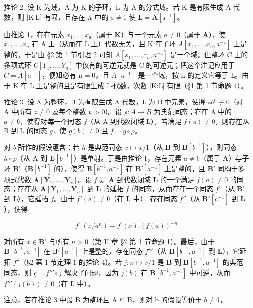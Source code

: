 推论 2. 设 K 为域，A 为 K 的子环，L 为 A 的分式域。若 K 是有限生成 A-代数，则 {[}K:L{]} 有限，且存在 A 中的 \(a \neq 0\) 使 \(\mathbf{L} = \mathbf{A}[a^{-1}]\)。

由推论 1，存在元素 \(x_{1}, \ldots, x_{n}\)（属于 \(\mathbf{K}\)）与一个元素 \(a \neq 0\)（属于 \(\mathbf{A}\)），使 \(x_{1}, \ldots, x_{n}\) 在 A 上（从而在 L 上）代数无关，且 K 在子环 \(A[x_{1},\ldots,x_{n},a^{-1}]\) 上是整的。于是由 §2 第 1 节引理 2 可知 \(A[x_{1},\ldots,x_{n},a^{-1}]\) 是一个域。但整环 C 上的多项式环 \(C[Y_{1},\ldots,Y_{n}]\) 中仅有的可逆元就是 C 的可逆元；把这个注记应用于 \(C = A[a^{-1}]\)，便知必有 n = 0，且 \(A[a^{-1}]\) 是一个域，按 L 的定义它等于 L。由于 K 在 L 上是整的且是有限生成 L-代数，次数 {[}K:L{]} 有限（§1 第 1 节命题 4）。

推论 3. 设 A 为整环，B 为有限生成 A-代数，b 为 B 中元素，使得 \(zb^n \neq 0\)（对 A 中所有 \(z \neq 0\) 及每个整数 \(n > 0\)）。设 \(\rho: A \to B\) 为典范同态；存在 A 中的 \(a \neq 0\)，使得对每一个同态 \(f\)（从 A 到代数闭域 L），若满足 \(f(a) \neq 0\)，则存在从 B 到 L 的同态 \(g\)，使 \(g(b) \neq 0\) 且 \(f = g \circ \rho\)。

对 \(b\) 所作的假设蕴含：若 \(h\) 是典范同态 \(x \mapsto x / 1\)（从 \(\mathbf{B}\) 到 \(\mathbf{B}[b^{-1}]\)），则同态 \(h \circ \rho\)（从 \(\mathbf{A}\) 到 \(\mathbf{B}[b^{-1}]\)）是单射。于是由推论 1，存在元素 \(a \neq 0\)（属于 \(\mathbf{A}\)）与子环 \(\mathbf{B}'\)（\(\mathbf{B}[b^{-1}]\) 的），使得 \(\mathbf{B}[b^{-1}, a^{-1}]\) 在 \(\mathbf{B}'[a^{-1}]\) 上是整的，且 \(\mathbf{B}'\) 同构于多项式代数 \(\mathbf{A}[\mathbf{Y}_1, \ldots, \mathbf{Y}_n]\)。设 \(f\) 是 \(\mathbf{A}\) 到代数闭域 \(\mathbf{L}\) 的一个满足 \(f(a) \neq 0\) 的同态；存在从 \(\mathbf{A}[\mathbf{Y}_1, \ldots, \mathbf{Y}_n]\) 到 \(\mathbf{L}\) 的延拓 \(f\) 的同态，从而存在一个同态 \(f'\)（从 \(\mathbf{B}'\) 到 \(\mathbf{L}\)），它延拓 \(f\)。由于 \(f'(a) \neq 0\)（在 \(\mathbf{L}\) 中），存在同态 \(f''\)（从 \(\mathbf{B}'[a^{-1}]\) 到 \(\mathbf{L}\)），使得

\[
f ^ {\prime \prime} (x / a ^ {n}) = f ^ {\prime} (x). (f (a)) ^ {- n}
\]

对所有 \(x \in \mathbf{B}'\) 与所有 \(n > 0\)（第 II 章 §2 第 1 节命题 1）。最后，由于 \(\mathbf{B}[b^{-1}, a^{-1}]\) 在 \(\mathbf{B}'[a^{-1}]\) 上是整的，存在同态 \(f'''\)（从 \(\mathbf{B}[b^{-1}, a^{-1}]\) 到 \(\mathbf{L}\)），它延拓 \(f''\)（§2 第 1 节定理 1 的推论 4）。若 \(j: x \mapsto x / 1\) 是 \(\mathbf{B}\) 到 \(\mathbf{B}[b^{-1}, a^{-1}]\) 的典范同态，则 \(g = f''' \circ j\) 解决了问题，因为 \(j(b)\) 在 \(\mathbf{B}[b^{-1}, a^{-1}]\) 中可逆，从而 \(f'''(j(b)) \neq 0\)（在 \(\mathbf{L}\) 中）。

注意，若在推论 3 中设 B 为整环且 A ⊆ B，则对 b 的假设等价于 \(b \neq 0\)。

